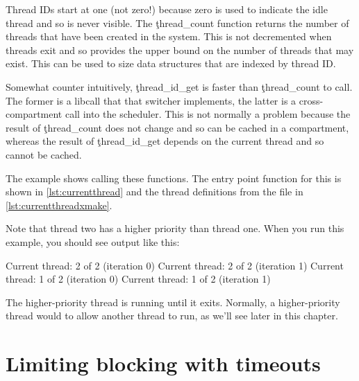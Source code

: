 
Thread IDs start at one (not zero!) because zero is used to indicate the idle thread and so is never visible.
The \c{thread_count} function returns the number of threads that have been created in the system.
This is not decremented when threads exit and so provides the upper bound on the number of threads that may exist.
This can be used to size data structures that are indexed by thread ID.


\begin{caution}
	Somewhat counter intuitively, \c{thread_id_get} is faster than \c{thread_count} to call.
	The former is a libcall that that switcher implements, the latter is a cross-compartment call into the scheduler.
	This is not normally a problem because the result of \c{thread_count} does not change and so can be cached in a compartment, whereas the result of \c{thread_id_get} depends on the current thread and so cannot be cached.
\end{caution}

The  example shows calling these functions.
The entry point function for this is shown in \ref{lst:currentthread} and the thread definitions from the  file in \ref{lst:currentthreadxmake}.

\codelisting[filename=examples/current_thread/current.cc,marker=entry,label=lst:currentthread,caption="A simple example that prints the current thread"]{}

\lualisting[filename=examples/current_thread/xmake.lua,marker=threads,label=lst:currentthreadxmake,caption="The thread definitions for the current-thread example"]{}

Note that thread two has a higher priority than thread one.
When you run this example, you should see output like this:

\begin{console}
Current thread: 2 of 2 (iteration 0)
Current thread: 2 of 2 (iteration 1)
Current thread: 1 of 2 (iteration 0)
Current thread: 1 of 2 (iteration 1)
\end{console}

The higher-priority thread is running until it exits.
Normally, a higher-priority thread would  to allow another thread to run, as we'll see later in this chapter.

\section[label=timeouts]{Limiting blocking with timeouts}

